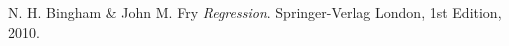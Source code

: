 \begin{thebibliography}{9}

  N. H. Bingham \& John M. Fry
  \emph{Regression}.
  Springer-Verlag London,
  1st Edition,
  2010.

\end{thebibliography}
